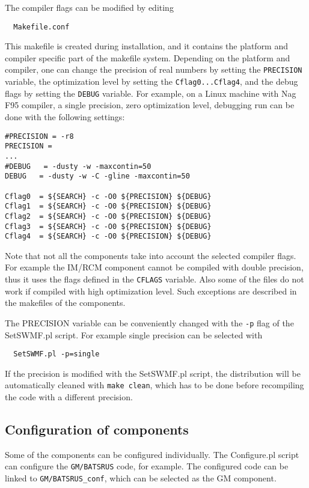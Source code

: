 The compiler flags can be modified by editing
\begin{verbatim}
  Makefile.conf
\end{verbatim}
This makefile is created during installation, and it contains the
platform and compiler specific part of the makefile system.
Depending on the platform and compiler, one can change the
precision of real numbers by setting the {\tt PRECISION} variable,
the optimization level by setting the {\tt Cflag0...Cflag4},
and the debug flags by setting the {\tt DEBUG} variable.
For example, on a Linux machine with Nag F95 compiler, a single
precision, zero optimization level, debugging run can be done
with the following settings:
\begin{verbatim}
#PRECISION = -r8
PRECISION =
...
#DEBUG   = -dusty -w -maxcontin=50
DEBUG   = -dusty -w -C -gline -maxcontin=50

Cflag0  = ${SEARCH} -c -O0 ${PRECISION} ${DEBUG}
Cflag1  = ${SEARCH} -c -O0 ${PRECISION} ${DEBUG}
Cflag2  = ${SEARCH} -c -O0 ${PRECISION} ${DEBUG}
Cflag3  = ${SEARCH} -c -O0 ${PRECISION} ${DEBUG}
Cflag4  = ${SEARCH} -c -O0 ${PRECISION} ${DEBUG}
\end{verbatim}
Note that not all the components take into account the selected
compiler flags. For example the IM/RCM component cannot be 
compiled with double precision, thus it uses the flags
defined in the {\tt CFLAGS} variable. Also some of the files
do not work if compiled with high optimization level.
Such exceptions are described in the makefiles of the 
components. 

The PRECISION variable can be conveniently changed with the
{\tt -p} flag of the SetSWMF.pl script. For example single
precision can be selected with
\begin{verbatim}
  SetSWMF.pl -p=single
\end{verbatim}
If the precision is modified with the SetSWMF.pl script,
the distribution will be automatically cleaned with 
{\tt make clean}, which has to be done before recompiling the
code with a different precision. 

\subsection{Configuration of components}

Some of the components can be configured individually. 
The Configure.pl script can configure the {\tt GM/BATSRUS} code, for example.
The configured code can be linked to {\tt GM/BATSRUS\_conf}, which can
be selected as the GM component.

